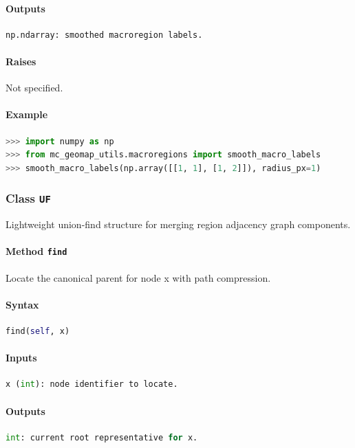 \documentclass[11pt]{article}
\begin{document}
\paragraph{Outputs}
\begin{lstlisting}[language=Python]
np.ndarray: smoothed macroregion labels.
\end{lstlisting}
\paragraph{Raises}
Not specified.
\paragraph{Example}
\begin{lstlisting}[language=Python]
>>> import numpy as np
>>> from mc_geomap_utils.macroregions import smooth_macro_labels
>>> smooth_macro_labels(np.array([[1, 1], [1, 2]]), radius_px=1)
\end{lstlisting}

\subsubsection{Class \texttt{UF}}
Lightweight union-find structure for merging region adjacency graph components.

\paragraph{Method \texttt{find}}
Locate the canonical parent for node x with path compression.

\paragraph{Syntax}
\begin{lstlisting}[language=Python]
find(self, x)
\end{lstlisting}
\paragraph{Inputs}
\begin{lstlisting}[language=Python]
x (int): node identifier to locate.
\end{lstlisting}
\paragraph{Outputs}
\begin{lstlisting}[language=Python]
int: current root representative for x.
\end{lstlisting}
\end{document}
